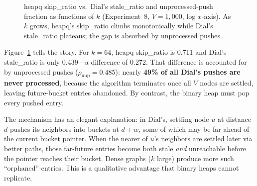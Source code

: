 \documentclass[conference]{IEEEtran}
\begin{document}
\begin{figure}[t]
\centering
{}
\caption{heapq skip\_ratio vs.\ Dial's stale\_ratio and unprocessed-push
fraction as functions of $k$ (Experiment~8, $V=1{,}000$, log $x$-axis).
As $k$ grows, heapq's skip\_ratio climbs monotonically while Dial's
stale\_ratio plateaus; the gap is absorbed by unprocessed pushes.}
\label{fig:stale}
\end{figure}

Figure~\ref{fig:stale} tells the story.  For $k=64$, heapq skip\_ratio is
0.711 and Dial's stale\_ratio is only 0.439---a difference of 0.272.  That
difference is accounted for by unprocessed pushes ($\rho_{\mathrm{unp}} =
0.485$): nearly \textbf{49\% of all Dial's pushes are never processed},
because the algorithm terminates once all $V$ nodes are settled, leaving
future-bucket entries abandoned.  By contrast, the binary heap must pop
every pushed entry.

The mechanism has an elegant explanation: in Dial's, settling node $u$ at
distance $d$ pushes its neighbors into buckets at $d + w$, some of which
may be far ahead of the current bucket pointer.  When the nearer of $u$'s
neighbors are settled later via better paths, those far-future entries
become both stale \emph{and} unreachable before the pointer reaches their
bucket.  Dense graphs ($k$ large) produce more such ``orphaned'' entries.
This is a qualitative advantage that binary heaps cannot replicate.
\end{document}
